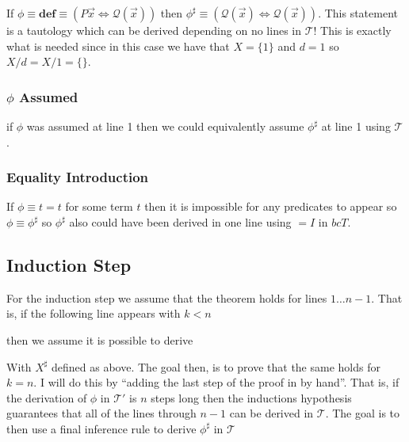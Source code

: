 \documentclass[12pt]{article}
\newcommand{\bv}[1]{\boldsymbol{#1}}
\newcommand{\mc}[1]{\mathcal{#1}}
\newcommand{\bc}[1]{\bv{\mc{#1}}}
\begin{document}
If $\phi\equiv \textbf{def}\equiv(P\vec{x}\Leftrightarrow \mc{Q}(\vec{x}))$ then $\phi^{\sharp} \equiv (\mc{Q}(\vec{x})\Leftrightarrow\mc{Q}(\vec{x}))$. This statement is a tautology which can be derived depending on no lines in $\mc{T}$! This is exactly what is needed since in this case we have that $X=\{1\}$ and $d=1$ so $X/d = X/1 = \{\}$.

\subsubsection*{$\phi$ Assumed}

if $\phi$ was assumed at line 1 then we could equivalently assume $\phi^{\sharp}$ at line 1 using $\bc{T}$.

\subsubsection*{Equality Introduction}

If $\phi\equiv t=t$ for some term $t$ then it is impossible for any predicates to appear so $\phi \equiv \phi^{\sharp}$ so $\phi^{\sharp}$ also could have been derived in one line using $=I$ in $bc{T}$.

\subsection{Induction Step}

For the induction step we assume that the theorem holds for lines $1\ldots n-1$. That is, if the following line appears with $k < n$

\begin{ND}[][][][][.6\linewidth]
\end{ND}

then we assume it is possible to derive

\begin{ND}[][][][][.6\linewidth]
\end{ND}

With $X^{\sharp}$ defined as above. The goal then, is to prove that the same holds for $k=n$. I will do this by ``adding the last step of the proof in by hand''. That is, if the derivation of $\phi$ in $\bc{T}'$ is $n$ steps long then the inductions hypothesis guarantees that all of the lines through $n-1$ can be derived in $\bc{T}$. The goal is to then use a final inference rule to derive $\phi^{\sharp}$ in $\bc{T}$
\end{document}
